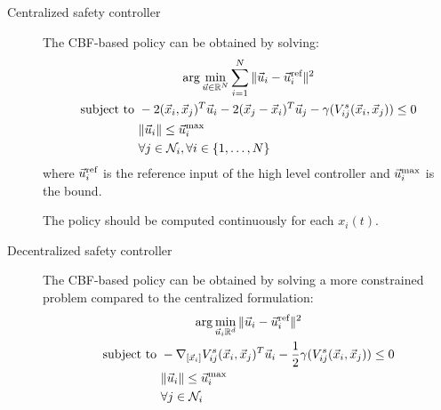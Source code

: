 \begin{description}
    \item[Centralized safety controller] 
        The CBF-based policy can be obtained by solving:
        \[
            \begin{gathered}
                \arg\min_{{\vec{u}} \in \mathbb{R}^N} \sum_{i=1}^{N} \Vert {\vec{u}}_i - {\vec{u}}_i^\text{ref} \Vert^2 \\
                \begin{aligned}
                    \text{subject to } 
                    &-2({\vec{x}}_i, {\vec{x}}_j)^T {\vec{u}}_i - 2({\vec{x}}_j-{\vec{x}}_i)^T {\vec{u}}_j - \gamma(V_{ij}^s({\vec{x}}_i, {\vec{x}}_j)) \leq 0 \\
                    & \Vert {\vec{u}}_i \Vert \leq {\vec{u}}_i^\text{max} \\
                    & \forall j \in \mathcal{N}_i, \forall i \in \{ 1, \dots, N \}
                \end{aligned}
            \end{gathered}
        \]
        where ${\vec{u}}_i^\text{ref}$ is the reference input of the high level controller and ${\vec{u}}_i^\text{max}$ is the bound.

        \begin{remark}
            The policy should be computed continuously for each $x_i(t)$.
        \end{remark}

    \item[Decentralized safety controller] 
        The CBF-based policy can be obtained by solving a more constrained problem compared to the centralized formulation:
        \[
            \begin{gathered}
                \arg\min_{{\vec{u}}_i \mathbb{R}^d} \Vert {\vec{u}}_i - {\vec{u}}_i^\text{ref} \Vert^2 \\
                \begin{aligned}
                    \text{subject to } &- \nabla_{[{\vec{x}}_i]} V_{ij}^s({\vec{x}}_i, {\vec{x}}_j)^T {\vec{u}}_i - \frac{1}{2} \gamma (V_{ij}^s({\vec{x}}_i, {\vec{x}}_j)) \leq 0 \\
                    & \Vert {\vec{u}}_i \Vert \leq {\vec{u}}_i^\text{max} \\
                    & \forall j \in \mathcal{N}_i
                \end{aligned}
            \end{gathered}
        \]


\end{description}
